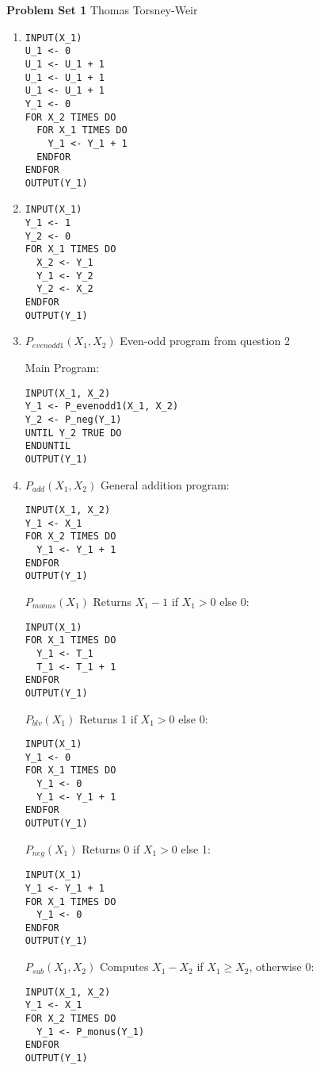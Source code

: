 \documentclass[10pt]{article}
\begin{document}
{\bf Problem Set 1} \hfill {\raggedleft Thomas Torsney-Weir}

\begin{enumerate}
\item %
  \begin{verbatim}
INPUT(X_1)
U_1 <- 0
U_1 <- U_1 + 1
U_1 <- U_1 + 1
U_1 <- U_1 + 1
Y_1 <- 0
FOR X_2 TIMES DO
  FOR X_1 TIMES DO
    Y_1 <- Y_1 + 1
  ENDFOR
ENDFOR
OUTPUT(Y_1)
  \end{verbatim}

\item %
  \begin{verbatim}
INPUT(X_1)
Y_1 <- 1
Y_2 <- 0
FOR X_1 TIMES DO
  X_2 <- Y_1
  Y_1 <- Y_2
  Y_2 <- X_2
ENDFOR
OUTPUT(Y_1)
  \end{verbatim}

\item %
  $P_{evenodd1}(X_1, X_2)$ Even-odd program from question 2
  
  Main Program:
  \begin{verbatim}
INPUT(X_1, X_2)
Y_1 <- P_evenodd1(X_1, X_2)
Y_2 <- P_neg(Y_1)
UNTIL Y_2 TRUE DO
ENDUNTIL
OUTPUT(Y_1)
  \end{verbatim}

\item %
  $P_{add}(X_1, X_2)$ General addition program:
  \begin{verbatim}
INPUT(X_1, X_2)
Y_1 <- X_1
FOR X_2 TIMES DO
  Y_1 <- Y_1 + 1
ENDFOR
OUTPUT(Y_1)
  \end{verbatim}

  $P_{monus}(X_1)$ Returns $X_1 - 1$ if $X_1 > 0$ else 0:
  \begin{verbatim}
INPUT(X_1)
FOR X_1 TIMES DO
  Y_1 <- T_1
  T_1 <- T_1 + 1
ENDFOR
OUTPUT(Y_1)
  \end{verbatim}

  $P_{blv}(X_1)$ Returns 1 if $X_1 > 0$ else 0:
  \begin{verbatim}
INPUT(X_1)
Y_1 <- 0
FOR X_1 TIMES DO
  Y_1 <- 0
  Y_1 <- Y_1 + 1
ENDFOR
OUTPUT(Y_1)
  \end{verbatim}

  $P_{neg}(X_1)$ Returns 0 if $X_1 > 0$ else 1:
  \begin{verbatim}
INPUT(X_1)
Y_1 <- Y_1 + 1
FOR X_1 TIMES DO
  Y_1 <- 0
ENDFOR
OUTPUT(Y_1)
  \end{verbatim}

  $P_{sub}(X_1, X_2)$ Computes $X_1 - X_2$ if $X_1 \ge X_2$, otherwise 0:
  \begin{verbatim}
INPUT(X_1, X_2)
Y_1 <- X_1
FOR X_2 TIMES DO
  Y_1 <- P_monus(Y_1)
ENDFOR
OUTPUT(Y_1)
  \end{verbatim}


\end{enumerate}
\end{document}
